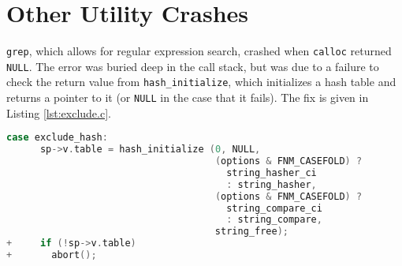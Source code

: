 \section{Other Utility Crashes}
\label{appendix:other_gnu}

\texttt{grep}, which allows for regular expression search, crashed when \texttt{calloc} returned \texttt{NULL}. The error was buried deep in the call stack, but was due to a failure to check the return value from \texttt{hash\_initialize}, which initializes a hash table and returns a pointer to it (or \texttt{NULL} in the case that it fails). The fix is given in Listing \ref{lst:exclude.c}.

\begin{lstlisting}[label={lst:exclude.c},firstnumber=265, caption={\texttt{lib/exclude.c}.}, language=C]
	case exclude_hash:
	  sp->v.table = hash_initialize (0, NULL,
	                                 (options & FNM_CASEFOLD) ?
	                                   string_hasher_ci
	                                   : string_hasher,
	                                 (options & FNM_CASEFOLD) ?
	                                   string_compare_ci
	                                   : string_compare,
	                                 string_free);
+	  if (!sp->v.table)
+	    abort();
                                          
\end{lstlisting}
